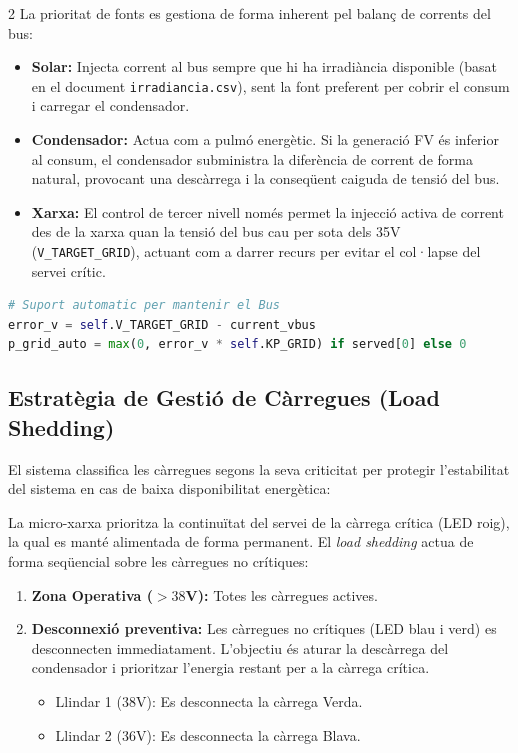 \documentclass[11pt,a4paper]{article}
\begin{document}
\begin{multicols}{2}
    La prioritat de fonts es gestiona de forma inherent pel balanç de corrents del bus:
    \begin{itemize}
        \item \textbf{Solar:} Injecta corrent al bus sempre que hi ha irradiància disponible (basat en el document \texttt{irradiancia.csv}), sent la font preferent per cobrir el consum i carregar el condensador.
        \item \textbf{Condensador:} Actua com a pulmó energètic. Si la generació FV és inferior al consum, el condensador subministra la diferència de corrent de forma natural, provocant una descàrrega i la conseqüent caiguda de tensió del bus.
        \item \textbf{Xarxa:} El control de tercer nivell només permet la injecció activa de corrent des de la xarxa quan la tensió del bus cau per sota dels 35V (\texttt{V\_TARGET\_GRID}), actuant com a darrer recurs per evitar el col·lapse del servei crític.
    \end{itemize}

    \begin{lstlisting}[language=Python]
# Suport automatic per mantenir el Bus 
error_v = self.V_TARGET_GRID - current_vbus
p_grid_auto = max(0, error_v * self.KP_GRID) if served[0] else 0
\end{lstlisting}

    \subsection{Estratègia de Gestió de Càrregues (Load Shedding)}
    El sistema classifica les càrregues segons la seva criticitat per protegir l'estabilitat del sistema en cas de baixa disponibilitat energètica:

    La micro-xarxa prioritza la continuïtat del servei de la càrrega crítica (LED roig), la qual es manté alimentada de forma permanent. El \textit{load shedding} actua de forma seqüencial sobre les càrregues no crítiques:
    \begin{enumerate}
        \item \textbf{Zona Operativa ($>38$V):} Totes les càrregues actives.
        \item \textbf{Desconnexió preventiva:} Les càrregues no crítiques (LED blau i verd) es desconnecten immediatament. L'objectiu és aturar la descàrrega del condensador i prioritzar l'energia restant per a la càrrega crítica.
              \begin{itemize}
                  \item Llindar 1 (38V): Es desconnecta la càrrega Verda.
                  \item Llindar 2 (36V): Es desconnecta la càrrega Blava.
              \end{itemize}


\end{enumerate}
\end{multicols}
\end{document}
